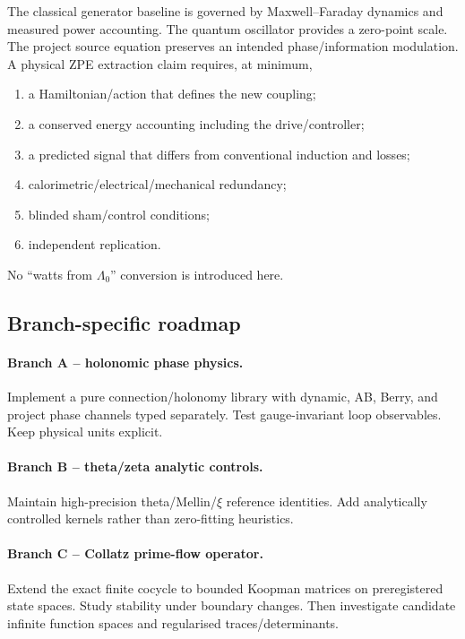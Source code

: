 The classical generator baseline is governed by Maxwell--Faraday dynamics and measured power accounting. The quantum oscillator provides a zero-point scale. The project source equation preserves an intended phase/information modulation. A physical ZPE extraction claim requires, at minimum,
\begin{enumerate}[leftmargin=2em]
\item a Hamiltonian/action that defines the new coupling;
\item a conserved energy accounting including the drive/controller;
\item a predicted signal that differs from conventional induction and losses;
\item calorimetric/electrical/mechanical redundancy;
\item blinded sham/control conditions;
\item independent replication.
\end{enumerate}
No ``watts from \(\Lambda_0\)'' conversion is introduced here.

\subsection{Branch-specific roadmap}

\paragraph{Branch A -- holonomic phase physics.}
Implement a pure connection/holonomy library with dynamic, AB, Berry, and project phase channels typed separately. Test gauge-invariant loop observables. Keep physical units explicit.

\paragraph{Branch B -- theta/zeta analytic controls.}
Maintain high-precision theta/Mellin/\(\xi\) reference identities. Add analytically controlled kernels rather than zero-fitting heuristics.

\paragraph{Branch C -- Collatz prime-flow operator.}
Extend the exact finite cocycle to bounded Koopman matrices on preregistered state spaces. Study stability under boundary changes. Then investigate candidate infinite function spaces and regularised traces/determinants.

